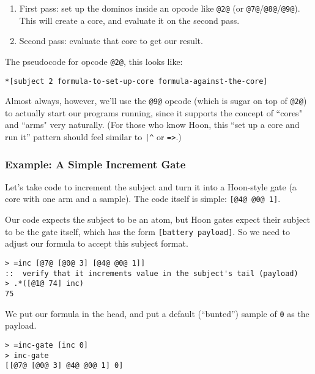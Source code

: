 \documentclass[twoside]{article}
\begin{document}
\begin{enumerate}
  \item  First pass:  set up the dominos inside an opcode like \lstinline[style=inlinecode]{@2@} (or \lstinline[style=inlinecode]{@7@}/\lstinline[style=inlinecode]{@8@}/\lstinline[style=inlinecode]{@9@}). This will create a core, and evaluate it on the second pass.
  \item  Second pass:  evaluate that core to get our result.
\end{enumerate}

The pseudocode for opcode \lstinline[style=inlinecode]{@2@}, this looks like:

\begin{lstlisting}[style=listingcode]
*[subject 2 formula-to-set-up-core formula-against-the-core]
\end{lstlisting}

Almost always, however, we'll use the \lstinline[style=inlinecode]{@9@} opcode (which is sugar on top of \lstinline[style=inlinecode]{@2@}) to actually start our programs running, since it supports the concept of ``cores" and ``arms" very naturally.  (For those who know Hoon, this “set up a core and run it” pattern should feel similar to \lstinline[style=inlinecode]{|^} or \lstinline[style=inlinecode]{=>}.)

\subsubsection{Example:  A Simple Increment Gate}

Let's take code to increment the subject and turn it into a Hoon-style gate (a core with one arm and a sample). The code itself is simple: \lstinline[style=inlinecode]{[@4@ @0@ 1]}.

Our code expects the subject to be an atom, but Hoon gates expect their subject to be the gate itself, which has the form \lstinline[style=inlinecode]{[battery payload]}. So we need to adjust our formula to accept this subject format.

\begin{lstlisting}[style=listingcode]
> =inc [@7@ [@0@ 3] [@4@ @0@ 1]]
::  verify that it increments value in the subject's tail (payload)
> .*([@1@ 74] inc)
75
\end{lstlisting}

We put our formula in the head, and put a default (``bunted'') sample of \lstinline[style=inlinecode]{0} as the payload.

\begin{lstlisting}[style=listingcode]
> =inc-gate [inc 0]
> inc-gate
[[@7@ [@0@ 3] @4@ @0@ 1] 0]
\end{lstlisting}
\end{document}
